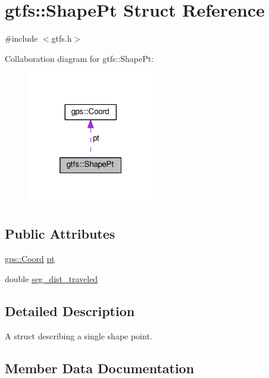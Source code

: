\hypertarget{structgtfs_1_1ShapePt}{}\section{gtfs\+:\+:Shape\+Pt Struct Reference}
\label{structgtfs_1_1ShapePt}


{\ttfamily \#include $<$gtfs.\+h$>$}



Collaboration diagram for gtfs\+:\+:Shape\+Pt\+:\nopagebreak
\begin{figure}[H]
\begin{center}
\leavevmode
\includegraphics[width=157pt]{structgtfs_1_1ShapePt__coll__graph}
\end{center}
\end{figure}
\subsection*{Public Attributes}
\begin{DoxyCompactItemize}
\item 
\hyperlink{classgps_1_1Coord}{gps\+::\+Coord} \hyperlink{structgtfs_1_1ShapePt_ab79eb8263213afd27be9b257fca8515a}{pt}
\item 
double \hyperlink{structgtfs_1_1ShapePt_ad3fe477575279af15fe33e0ce36eaad2}{seg\+\_\+dist\+\_\+traveled}
\end{DoxyCompactItemize}


\subsection{Detailed Description}
A struct describing a single shape point. 

\subsection{Member Data Documentation}
\mbox{\label{structgtfs_1_1ShapePt_ab79eb8263213afd27be9b257fca8515a}} 
